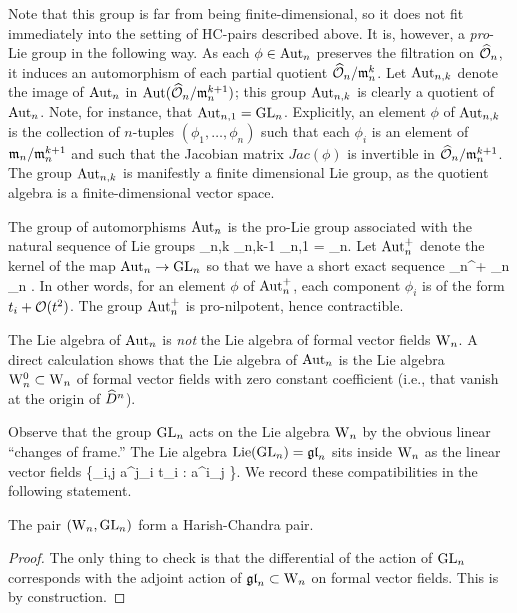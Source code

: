 Note that this group is far from being finite-dimensional, so it does not fit immediately into the setting of HC-pairs described above. 
It is, however, a {\em pro}-Lie group in the following way. 
As each $\phi \in {\rm Aut}_n$ preserves the filtration on $\widehat{\mathcal O}_n$, it induces an automorphism of each partial quotient $\widehat{\mathcal O}_n/{\mathfrak m}_n^k$.
Let ${\rm Aut}_{n,k}$ denote the image of ${\rm Aut}_n$ in ${\rm Aut}(\widehat{\mathcal O}_n/{\mathfrak m}_n^{k+1})$; this group ${\rm Aut}_{n,k}$ is clearly a quotient of ${\rm Aut}_n$.
Note, for instance, that ${\rm Aut}_{n,1} = {\rm GL}_n$.
Explicitly, an element $\phi$ of ${\rm Aut}_{n,k}$ is the collection of $n$-tuples $(\phi_1,\ldots,\phi_n)$ 
such that each $\phi_i$ is an element of ${\mathfrak m}_n/{\mathfrak m}_n^{k+1}$ and such that the Jacobian matrix $Jac(\phi)$ is invertible in $\widehat{\mathcal O}_n/{\mathfrak m}_n^{k+1}$.
The group ${\rm Aut}_{n,k}$ is manifestly a finite dimensional Lie group, as the quotient algebra is a finite-dimensional vector space. 
 
The group of automorphisms ${\rm Aut}_n$ is the pro-Lie group associated with the natural sequence of Lie groups
\ben
\cdots \to \Aut_{n,k} \to \Aut_{n,k-1} \to \cdots \to \Aut_{n,1} = \GL_n.
\een
Let ${\rm Aut}_n^+$ denote the kernel of the map ${\rm Aut}_n \to {\rm GL}_n$ so that we have a short exact sequence
 \to \Aut_n^+ \to \Aut_n \to \GL_n  .
\een
In other words, for an element $\phi$ of ${\rm Aut}_n^+$, each component
$\phi_i$ is of the form $t_i + \mathcal O(t^2)$. The group ${\rm Aut}_n^+$ is
pro-nilpotent, hence contractible. 

The Lie algebra of ${\rm Aut}_n$ is {\em not} the Lie algebra of formal
vector fields ${{\rm W}_n}$. A direct
calculation shows that the Lie algebra of ${\rm Aut}_n$ is the Lie algebra ${{\rm W}^0_n} \subset {{\rm W}_n}$ of formal vector fields with zero constant coefficient (i.e., that vanish at the origin of $\widehat{D}^n$). 

Observe that the group ${\rm GL}_n$ acts on the Lie algebra ${{\rm W}_n}$ by the obvious linear ``changes of frame.''
The Lie algebra ${\rm Lie}({{\rm GL}_n}) = {\mathfrak{gl}}_n$ sits inside ${{\rm W}_n}$ as the linear vector fields
\ben
\left\{\sum_{i,j} a^j_i t_i  \; : \; a^{i}_j \in \CC \right\}.
\een 
We record these compatibilities in the following statement.

\begin{lemma} 
The pair $({{\rm W}_n}, {\rm GL}_n)$ form a Harish-Chandra pair.
\end{lemma}
\begin{proof} The only thing to check is that the differential of the
  action of ${\rm GL}_n$ corresponds with the adjoint action of ${\mathfrak{gl}}_n
  \subset {{\rm W}_n}$ on formal vector fields. This is by construction. 
\end{proof}

